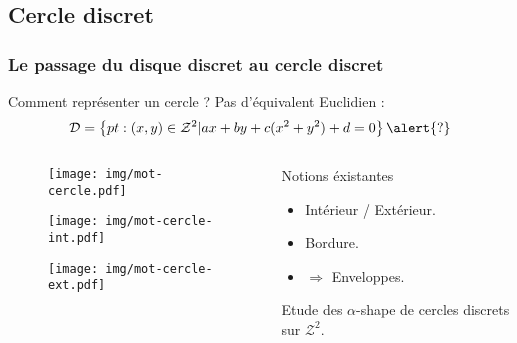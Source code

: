 \documentclass{beamer}
\begin{document}
\subsection{Cercle discret}
\begin{frame}
\frametitle{Le passage du disque discret au cercle discret}

  \begin{block}{Comment représenter un cercle ?}
    Pas d'équivalent Euclidien : 
    \vspace{-0.4cm}
    $$\mathcal{D} =  \left\{ pt : (x,y) \in \mathcal{Z}^{2} |  ax + by + c(x^2 + y^2) + d = 0 \right\} \alert{?} $$ 
  \end{block}
  
  \begin{columns}[t]
    \begin{column}{6cm}
      {
        \begin{figure}[h!]
          \centering
          \texttt{[image: img/mot-cercle.pdf]}
        \end{figure}
      }
      {
        \begin{figure}[h!]
          \centering
          \texttt{[image: img/mot-cercle-int.pdf]}
        \end{figure}
      }
      {
        \begin{figure}[h!]
          \centering
          \texttt{[image: img/mot-cercle-ext.pdf]}
        \end{figure}
      }
    \end{column}

    \begin{column}{5cm}
      \begin{exampleblock}{Notions éxistantes}
       
        \begin{itemize}
          \item Intérieur / Extérieur.
          \item Bordure.
          \item  $\Rightarrow$ Enveloppes.
        \end{itemize}
      \end{exampleblock} 
      {
        \begin{center}  
          \alert{Etude des $\alpha$-shape de cercles discrets sur $\mathcal{Z}^{2}$.}
        \end{center}
      }
    \end{column}
  \end{columns} 
  

\end{frame}
\end{document}
